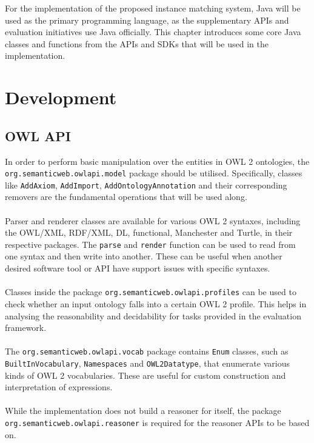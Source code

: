 
For the implementation of the proposed instance matching system, Java will be used as the primary programming language, as the supplementary APIs and evaluation initiatives use Java officially. This chapter introduces some core Java classes and functions from the APIs and SDKs that will be used in the implementation.

\section{Development}

\subsection{OWL API}

In order to perform basic manipulation over the entities in OWL 2 ontologies, the \\
\texttt{org.semanticweb.owlapi.model} package should be utilised. Specifically, classes like \texttt{AddAxiom}, \texttt{AddImport}, \texttt{AddOntologyAnnotation} and their corresponding removers are the fundamental operations that will be used along.
\\\\
Parser and renderer classes are available for various OWL 2 syntaxes, including the OWL/XML, RDF/XML, DL, functional, Manchester and Turtle, in their respective packages. The \texttt{parse} and \texttt{render} function can be used to read from one syntax and then write into another. These can be useful when another desired software tool or API have support issues with specific syntaxes.
\\\\
Classes inside the package \texttt{org.semanticweb.owlapi.profiles} can be used to check whether an input ontology falls into a certain OWL 2 profile. This helps in analysing the reasonability and decidability for tasks provided in the evaluation framework.
\\\\
The \texttt{org.semanticweb.owlapi.vocab} package contains \texttt{Enum} classes, such as \\
\texttt{BuiltInVocabulary}, \texttt{Namespaces} and \texttt{OWL2Datatype}, that enumerate various kinds of OWL 2 vocabularies. These are useful for custom construction and interpretation of expressions.
\\\\
While the implementation does not build a reasoner for itself, the package \\
\texttt{org.semanticweb.owlapi.reasoner} is required for the reasoner APIs to be based on.

